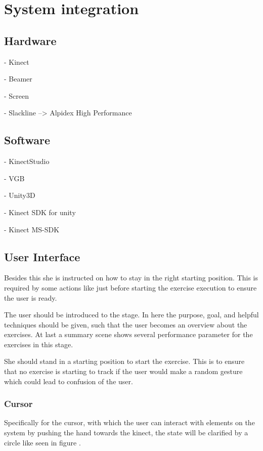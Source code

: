 \chapter{System integration}\label{5_systemIntegration}

\section{Hardware}
- Kinect

- Beamer

- Screen

- Slackline --> Alpidex High Performance

\section{Software}
- KinectStudio

- VGB

- Unity3D

- Kinect SDK for unity

- Kinect MS-SDK

\section{User Interface}
Besides this she is instructed on how to stay in the right starting position. This is required by some actions like just before starting the exercise execution to ensure the user is ready.

The user should be introduced to the stage. In here the purpose, goal, and helpful techniques should be given, such that the user becomes an overview about the exercises. At last a summary scene shows several performance parameter for the exercises in this stage.

She should stand in a starting position to start the exercise. This is to ensure that no exercise is starting to track if the user would make a random gesture which could lead to confusion of the user.
\subsection{Cursor}
Specifically for the cursor, with which the user can interact with elements on the system by pushing the hand towards the kinect, the state will be clarified by a circle like seen in figure .

